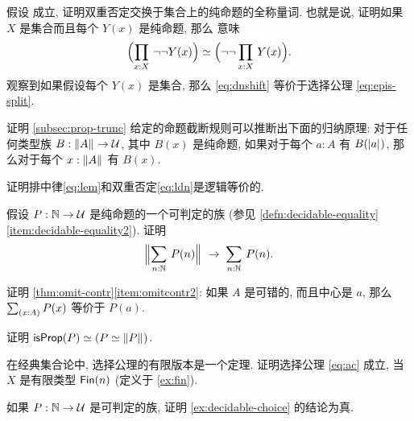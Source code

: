 \begin{ex}
    \label{ex:lem-impl-dn-commutes}
    假设 \LEM{} 成立, 证明双重否定交换于集合上的纯命题的全称量词.
    也就是说, 证明如果 $X$ 是集合而且每个 $Y(x)$ 是纯命题, 那么 \LEM{} 意味
    \begin{equation}
        \eqv{\Parens{\prd{x:X} \neg\neg Y(x)}}{\Parens{\neg\neg \prd{x:X} Y(x)}}.\label{eq:dnshift}
    \end{equation}
    观察到如果假设每个 $Y(x)$ 是集合, 那么 \eqref{eq:dnshift} 等价于选择公理 \eqref{eq:epis-split}.
\end{ex}

\begin{ex}
    \label{ex:prop-trunc-ind}
    证明 \cref{subsec:prop-trunc} 给定的命题截断规则可以推断出下面的归纳原理:
    对于任何类型族 $B:\mathopen{}\left\Vert A\right\Vert_{}\mathclose{} \to \mathcal{U}$, 其中 $B(x)$ 是纯命题, 如果对于每个 $a:A$ 有 $B(\mathopen{}\left|a\right|_{}^{}\mathclose{})$, 那么对于每个 $x:\mathopen{}\left\Vert A\right\Vert_{}\mathclose{}$ 有 $B(x)$.
\end{ex}

\begin{ex}
    \label{ex:lem-ldn}
    证明排中律\eqref{eq:lem}和双重否定\eqref{eq:ldn}是逻辑等价的.
\end{ex}

\begin{ex}
    \label{ex:decidable-choice}
    假设 $P:\mathbb{N}\to\mathcal{U}$ 是纯命题的一个可判定的族 (参见 \cref{defn:decidable-equality}\ref{item:decidable-equality2}).
    证明
    \[ \Brck{\sm{n:\nat} P(n)} \;\to\; \sm{n:\nat}P(n).\]
\end{ex}

\begin{ex}
    \label{ex:omit-contr2}
    证明 \cref{thm:omit-contr}\ref{item:omitcontr2}: 如果 $A$ 是可错的, 而且中心是 $a$, 那么 $\sm{x:A} P(x)$ 等价于 $P(a)$.
\end{ex}

\begin{ex}
    \label{ex:isprop-equiv-equiv-bracket}
    证明 $\mathsf{isProp}(P) \simeq (P \simeq \mathopen{}\left\Vert P\right\Vert_{}\mathclose{})$.
\end{ex}

\begin{ex}
    \label{ex:finite-choice}
    在经典集合论中, 选择公理的有限版本是一个定理. 证明选择公理 \eqref{eq:ac} 成立, 当 $X$ 是有限类型 $\mathsf{Fin}(n)$ (定义于 \cref{ex:fin}).
\end{ex}

\begin{ex}
    \label{ex:decidable-choice-strong}
    如果 $P:\mathbb{N}\to\mathcal{U}$ 是可判定的族, 证明 \cref{ex:decidable-choice} 的结论为真.
\end{ex}

